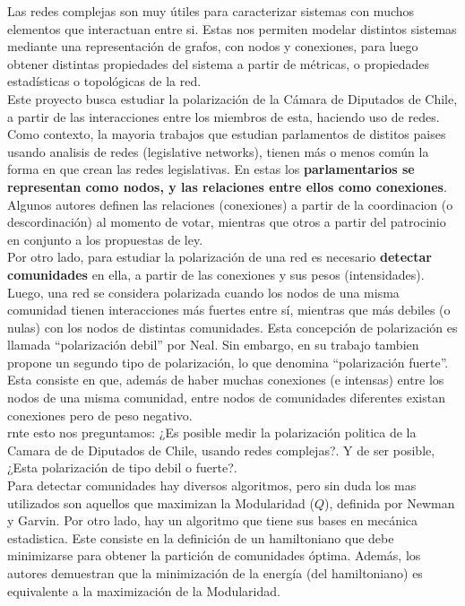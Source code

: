 \documentclass{proyectotesis}
\begin{document}
Las redes complejas son muy útiles para caracterizar sistemas con muchos elementos que interactuan entre si. Estas nos permiten modelar distintos sistemas mediante una representación de grafos, con nodos y conexiones, para luego obtener distintas propiedades del sistema a partir de métricas, o propiedades estadísticas o topológicas de la red.\\

Este proyecto busca estudiar la polarización de la Cámara de Diputados de Chile, a partir de las interacciones entre los miembros de esta, haciendo uso de redes. 
Como contexto, la mayoria trabajos que estudian parlamentos de distitos paises usando analisis de redes (legislative networks), tienen más o menos común la forma en que crean las redes legislativas. En estas los \textbf{parlamentarios se representan como nodos, y las relaciones entre ellos como conexiones}. Algunos autores definen las relaciones (conexiones) a partir de la coordinacion (o descordinación) al momento de votar, mientras que otros a partir del patrocinio en conjunto a los propuestas de ley.\\

Por otro lado, para estudiar la polarización de una red es necesario \textbf{detectar comunidades} en ella, a partir de las conexiones y sus pesos (intensidades). Luego, una red se considera polarizada cuando los nodos de una misma comunidad tienen interacciones más fuertes entre sí, mientras que más debiles (o nulas) con los nodos de distintas comunidades. Esta concepción de polarización es llamada ``polarización debil'' por Neal. Sin embargo, en su trabajo tambien propone un segundo tipo de polarización, lo que denomina ``polarización fuerte''. Esta consiste en que, además de haber muchas conexiones (e intensas) entre los nodos de una misma comunidad, entre nodos de comunidades diferentes existan conexiones pero de peso negativo.\\

rnte esto nos preguntamos: ¿Es posible medir la polarización politica de la Camara de de Diputados de Chile, usando redes complejas?. Y de ser posible, ¿Esta polarización de tipo debil o fuerte?.\\

Para detectar comunidades hay diversos algoritmos, pero sin duda los mas utilizados son aquellos que maximizan la Modularidad ($Q$), definida por Newman y Garvin. Por otro lado, hay un algoritmo que tiene sus bases en mecánica estadistica. Este consiste en la definición de un hamiltoniano que debe minimizarse para obtener la partición de comunidades óptima. Además, los autores demuestran que la minimización de la energía (del hamiltoniano) es equivalente a la maximización de la Modularidad.
\end{document}
